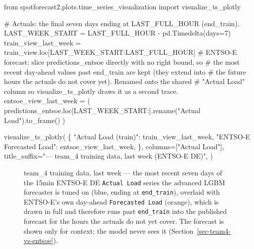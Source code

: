 \documentclass[
  english,
  letterpaper,
]{scrbook}
\newenvironment{Shaded}{\begin{snugshade}}{\end{snugshade}}
\newcommand{\CommentTok}[1]{\textcolor[rgb]{0.37,0.37,0.37}{#1}}
\newcommand{\DecValTok}[1]{\textcolor[rgb]{0.68,0.00,0.00}{#1}}
\newcommand{\ImportTok}[1]{\textcolor[rgb]{0.00,0.46,0.62}{#1}}
\newcommand{\NormalTok}[1]{\textcolor[rgb]{0.00,0.23,0.31}{#1}}
\newcommand{\OperatorTok}[1]{\textcolor[rgb]{0.37,0.37,0.37}{#1}}
\newcommand{\StringTok}[1]{\textcolor[rgb]{0.13,0.47,0.30}{#1}}
\begin{document}
\begin{Shaded}
\begin{Highlighting}[]
\ImportTok{from}\NormalTok{ spotforecast2.plots.time\_series\_visualization }\ImportTok{import}\NormalTok{ visualize\_ts\_plotly}

\CommentTok{\# Actuals: the final seven days ending at LAST\_FULL\_HOUR (end\_train).}
\NormalTok{LAST\_WEEK\_START }\OperatorTok{=}\NormalTok{ LAST\_FULL\_HOUR }\OperatorTok{{-}}\NormalTok{ pd.Timedelta(days}\OperatorTok{=}\DecValTok{7}\NormalTok{)}
\NormalTok{train\_view\_last\_week }\OperatorTok{=}\NormalTok{ train\_view.loc[LAST\_WEEK\_START:LAST\_FULL\_HOUR]}
\CommentTok{\# ENTSO{-}E forecast: slice predictions\_entsoe directly with no right bound, so}
\CommentTok{\# the most recent day{-}ahead values past end\_train are kept (they extend into}
\CommentTok{\# the future hours the actuals do not cover yet). Renamed onto the shared}
\CommentTok{\# "Actual Load" column so visualize\_ts\_plotly draws it as a second trace.}
\NormalTok{entsoe\_view\_last\_week }\OperatorTok{=}\NormalTok{ (}
\NormalTok{    predictions\_entsoe.loc[LAST\_WEEK\_START:].rename(}\StringTok{"Actual Load"}\NormalTok{).to\_frame()}
\NormalTok{)}

\NormalTok{visualize\_ts\_plotly(}
\NormalTok{    \{}
        \StringTok{"Actual Load (train)"}\NormalTok{:      train\_view\_last\_week,}
        \StringTok{"ENTSO{-}E Forecasted Load"}\NormalTok{:  entsoe\_view\_last\_week,}
\NormalTok{    \},}
\NormalTok{    columns}\OperatorTok{=}\NormalTok{[}\StringTok{"Actual Load"}\NormalTok{],}
\NormalTok{    title\_suffix}\OperatorTok{=}\StringTok{"— team\_4 training data, last week (ENTSO{-}E DE)"}\NormalTok{,}
\NormalTok{)}
\end{Highlighting}
\end{Shaded}

\begin{figure}


\caption{\label{fig-team4-training-data-visualization-last-week}team\_4
training data, last week --- the most recent seven days of the 15min
ENTSO-E DE \texttt{Actual\ Load} series the advanced LGBM forecaster is
tuned on (blue, ending at \texttt{end\_train}), overlaid with ENTSO-E's
own day-ahead \texttt{Forecasted\ Load} (orange), which is drawn in full
and therefore runs past \texttt{end\_train} into the published forecast
for the hours the actuals do not yet cover. The forecast is shown only
for context; the model never sees it
(Section~\ref{sec-team4-vs-entsoe}).}

\end{figure}%
\end{document}
